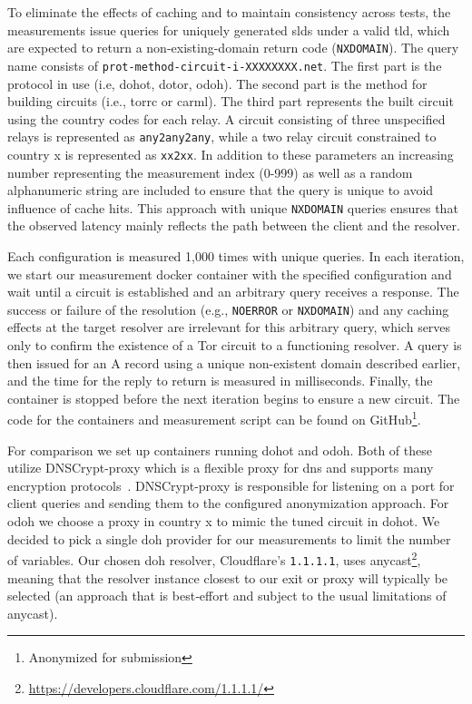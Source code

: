 To eliminate the effects of caching and to maintain consistency across tests,
the measurements issue queries for uniquely generated \acp{sld} under a valid
\ac{tld}, which are expected to return a non-existing-domain return code
(\texttt{NXDOMAIN}). The query name consists of
\texttt{prot-method-circuit-i-XXXXXXXX.net}. The first part is the protocol in
use (i.e, \ac{dohot}, \ac{dotor}, \ac{odoh}). The second part is the method for
building circuits (i.e., torrc or carml). The third part represents the built
circuit using the country codes for each relay. A circuit consisting of three
unspecified relays is represented as \texttt{any2any2any}, while a two relay
circuit constrained to country x is represented as \texttt{xx2xx}. In addition to
these parameters an increasing number representing the measurement index
(0-999) as well as a random alphanumeric string are included to ensure that the
query is unique to avoid influence of cache hits. This approach with unique
\texttt{NXDOMAIN} queries ensures that the observed latency mainly reflects the
path between the client and the resolver.

Each configuration is measured 1,000 times with unique queries. In each
iteration, we start our measurement docker container with the specified
configuration and wait until a circuit is established and an arbitrary query
receives a response. The success or failure of the resolution (e.g.,
\texttt{NOERROR} or \texttt{NXDOMAIN}) and any caching effects at the target
resolver are irrelevant for this arbitrary query, which serves only to confirm
the existence of a Tor circuit to a functioning resolver. A query is then
issued for an A record using a unique non-existent domain described earlier,
and the time for the reply to return is measured in milliseconds. Finally, the
container is stopped before the next iteration begins to ensure a new circuit.
The code for the containers and measurement script can be found on
GitHub\footnote{Anonymized for submission}.

For comparison we set up containers running \ac{dohot} and \ac{odoh}. Both of
these utilize DNSCrypt-proxy which is a flexible proxy for \ac{dns} and
supports many encryption protocols~\cite{dnscrypt-proxy}. DNSCrypt-proxy is
responsible for listening on a port for client queries and sending them to the
configured anonymization approach. For \ac{odoh} we choose a proxy in country x to
mimic the tuned circuit in \ac{dohot}. We decided to pick a single \ac{doh}
provider for our measurements to limit the number of variables. Our chosen
\ac{doh} resolver, Cloudflare's \texttt{1.1.1.1}, uses
anycast\footnote{\url{https://developers.cloudflare.com/1.1.1.1/}}, meaning
that the resolver instance closest to our exit or proxy will typically be
selected (an approach that is best‑effort and subject to the usual limitations
of anycast).

